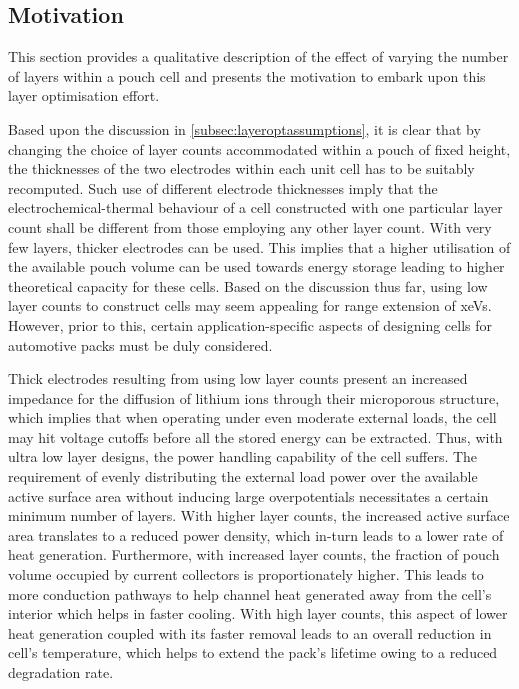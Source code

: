 \subsection{Motivation}\label{subsec:layeroptmotivation}

This section provides a  qualitative description of the effect of varying the
number of layers  within a pouch cell and presents  the motivation to embark
upon this layer optimisation effort.

Based upon the  discussion in \cref{subsec:layeroptassumptions},  it is clear
that  by changing the choice of layer counts accommodated within  a pouch  of
fixed height, the thicknesses of the two electrodes within each unit cell has to
be suitably recomputed.   Such use of different electrode thicknesses imply that
the electrochemical-thermal behaviour  of a cell constructed with one particular
layer count shall be different from those employing any other layer count. With
very few layers, thicker electrodes can be used. This implies that a higher
utilisation of the available pouch volume can be used towards energy storage
leading to higher theoretical capacity for these cells. Based  on the
discussion thus far,  using low layer counts to construct cells may seem
appealing for range extension of \glspl{xeV}. However, prior to this, certain
application-specific aspects of designing cells for automotive packs must be
duly considered.

Thick electrodes resulting from using low layer counts present an increased
impedance for the diffusion of lithium ions through their microporous structure,
which implies that when operating under even moderate external loads, the cell
may hit voltage cutoffs before all the stored energy can be extracted. Thus,
with ultra low layer designs, the power handling capability of the cell suffers.
The requirement of evenly distributing  the external load power  over the
available active surface area without inducing large overpotentials necessitates
a certain minimum number of layers.  With higher layer counts, the increased
active surface area translates to a reduced  power density, which in-turn leads
to a lower rate of heat generation. Furthermore, with increased layer counts,
the fraction of pouch volume occupied by current collectors is proportionately
higher. This leads to more conduction pathways to help channel heat generated
away from the cell's interior which helps in faster cooling. With high layer
counts, this aspect of lower heat generation coupled with its faster removal
leads to an overall reduction in cell's temperature, which helps to extend the
pack's lifetime owing to a reduced degradation rate.


